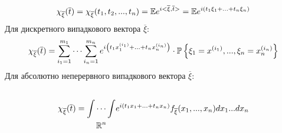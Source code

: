 $$
\chi_{\overline{\xi}} (\overline{t}) = \chi_{\overline{\xi}} (t_1, t_2, ..., t_n) = \mathbb{E} e^{i< \overline{\xi}, \overline{t}>}  = \mathbb{E} e^{i  \left( t_1 \xi_1 + ... + t_n \xi_n \right) }
$$
Для дискретного випадкового вектора $\overline{\xi}$:
$$
\chi_{\overline{\xi}} (\overline{t}) =  \sum\limits_{i_1 = 1}^{ m_1}\cdots  \sum\limits_{i_n = 1}^{ m_n}{
e^{i \left( t_1 x_1^{(i_1)}+ ... + t_n x_n^{(i_n)} \right) } \cdot \mathbb{P} \left\lbrace \xi_1 = x^{(i_1)}, ..., \xi_n = x_n^{(i_n)} \right\rbrace
}
$$
Для абсолютно неперервного випадкового вектора $\overline{\xi}$:
$$
\chi_{\overline{\xi}} (\overline{t}) =  \begin{gathered}
   \\
	 \int \cdots  \int \\
	 {\small \mathbb{R}^{n}}
\end{gathered} e^{i(t_1 x_1 + ... + t_n x_n)} f_{\overline{\xi}}(x_1, ... , x_n)dx_1...dx_n
$$

